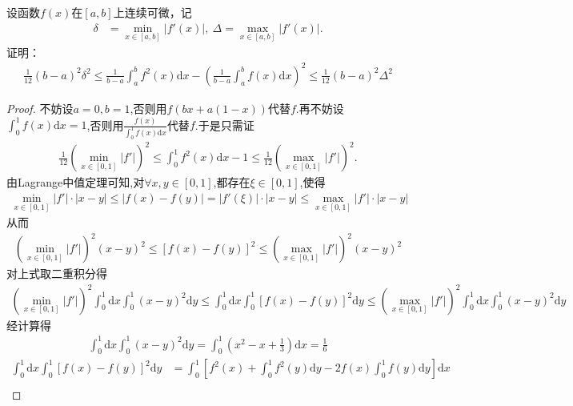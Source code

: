 \documentclass[../../main.tex]{subfiles}%
\begin{document}
\begin{example}
设函数$f(x)$在$[a,b]$上连续可微，记
\begin{align*}
\delta &= \min_{x\in[a,b]} |f'(x)|, \ \Delta = \max_{x\in[a,b]} |f'(x)|.
\end{align*}
证明：
\begin{align*}
\frac{1}{12}(b - a)^2\delta^2 \leqslant \frac{1}{b - a}\int_a^b f^2(x)\mathrm{d}x - \left( \frac{1}{b - a}\int_a^b f(x)\mathrm{d}x \right)^2 \leqslant \frac{1}{12}(b - a)^2\Delta^2
\end{align*}
\end{example}
\begin{proof}

不妨设$a=0,b=1$,否则用$f(bx+a(1-x))$代替$f$.再不妨设$\int_0^1 f(x)\mathrm{d}x=1$,否则用$\frac{f(x)}{\int_0^1 f(x)\mathrm{d}x}$代替$f$.于是只需证
\begin{align*}
\frac{1}{12}\left( \min\limits_{x\in[0,1]} |f'| \right)^2 \leqslant \int_0^1 f^2(x)\mathrm{d}x - 1 \leqslant \frac{1}{12}\left( \max\limits_{x\in[0,1]} |f'| \right)^2.
\end{align*}
由Lagrange中值定理可知,对$\forall x,y\in[0,1]$,都存在$\xi\in[0,1]$,使得
\begin{align*}
\min\limits_{x\in[0,1]} |f'| \cdot |x - y| \leqslant |f(x) - f(y)| = |f'(\xi)| \cdot |x - y| \leqslant \max\limits_{x\in[0,1]} |f'| \cdot |x - y|
\end{align*}
从而
\begin{align*}
\left( \min\limits_{x\in[0,1]} |f'| \right)^2 (x - y)^2 \leqslant [f(x) - f(y)]^2 \leqslant \left( \max\limits_{x\in[0,1]} |f'| \right)^2 (x - y)^2
\end{align*}
对上式取二重积分得
\begin{align}
\left( \min\limits_{x\in[0,1]} |f'| \right)^2 \int_0^1 \mathrm{d}x \int_0^1 (x - y)^2 \mathrm{d}y \leqslant \int_0^1 \mathrm{d}x \int_0^1 [f(x) - f(y)]^2 \mathrm{d}y \leqslant \left( \max\limits_{x\in[0,1]} |f'| \right)^2 \int_0^1 \mathrm{d}x \int_0^1 (x - y)^2 \mathrm{d}y \label{eq:fwr3-vke9-kk34g4k::if9k2r321.1}
\end{align}
经计算得
\begin{align*}
\int_0^1 \mathrm{d}x \int_0^1 (x - y)^2 \mathrm{d}y = \int_0^1 \left( x^2 - x + \frac{1}{3} \right) \mathrm{d}x = \frac{1}{6}
\end{align*}
\begin{align*}
\int_0^1 \mathrm{d}x \int_0^1 [f(x) - f(y)]^2 \mathrm{d}y &= \int_0^1 \left[ f^2(x) + \int_0^1 f^2(y) \mathrm{d}y - 2f(x) \int_0^1 f(y) \mathrm{d}y \right] \mathrm{d}x \\

\end{align*}
\end{proof}
\end{document}
